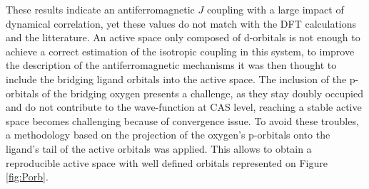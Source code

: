 \documentclass[12pt]{report}
\numberwithin{equation}{section}
\begin{document}
These results indicate an antiferromagnetic $J$ coupling with a large impact of dynamical correlation, yet these values do not match with the DFT calculations and the litterature.
An active space only composed of d-orbitals is not enough to achieve a correct estimation of the isotropic coupling in this system, to improve the description of the antiferromagnetic mechanisms it was then thought to include the bridging ligand orbitals into the active space.
The inclusion of the p-orbitals of the bridging oxygen presents a challenge, as they stay doubly occupied and do not contribute to the wave-function at CAS level, reaching a stable active space becomes challenging because of convergence issue.
To avoid these troubles, a methodology based on the projection of the oxygen's p-orbitals onto the ligand's tail of the active orbitals was applied.
This allows to obtain a reproducible active space with well defined orbitals represented on Figure \ref{fig:Porb}.
\end{document}
